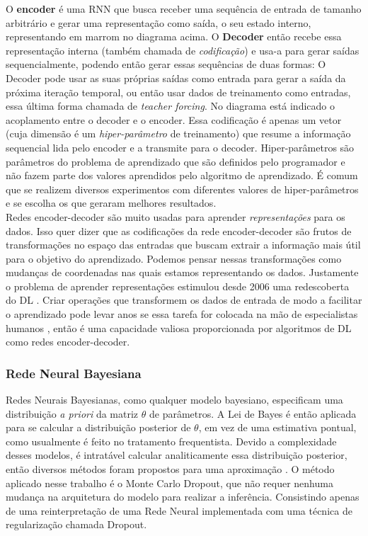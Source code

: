 O \textbf{encoder} é uma RNN que busca receber uma sequência de entrada de
tamanho arbitrário e gerar uma representação como saída, o seu estado interno,
representando em marrom no diagrama acima. O \textbf{Decoder} então recebe essa representação interna (também chamada
de \textit{codificação}) e usa-a para gerar saídas sequencialmente, podendo
então gerar essas sequências de duas formas: O Decoder pode usar as suas próprias saídas
como entrada para gerar a saída da próxima iteração temporal, ou então usar dados de treinamento como
entradas, essa última forma chamada de \textit{teacher forcing}. No diagrama
está indicado o acoplamento entre o decoder e o encoder. Essa codificação é apenas
um vetor (cuja dimensão é um \textit{hiper-parâmetro} de treinamento) que resume a
informação sequencial lida pelo encoder e a transmite para o decoder.
Hiper-parâmetros são parâmetros do problema de aprendizado que são definidos
pelo programador e não fazem parte dos valores aprendidos pelo algoritmo de
aprendizado. É comum que se realizem diversos experimentos com diferentes
valores de hiper-parâmetros e se escolha os que geraram melhores resultados. 
\\

Redes encoder-decoder são muito usadas para aprender \textit{representações} para os
dados. Isso quer dizer que as codificações da rede encoder-decoder são frutos de
transformações no espaço das entradas que buscam extrair a informação mais útil
para o objetivo do aprendizado. Podemos pensar nessas transformações como
mudanças de coordenadas nas quais estamos representando os dados. Justamente o problema de aprender
representações estimulou desde 2006 uma redescoberta do DL \citep{dlbook}. Criar
operações que transformem os dados de entrada de modo a facilitar o aprendizado
pode levar anos se essa tarefa for colocada na mão de especialistas humanos
\citep{dlbook}, então é uma capacidade valiosa proporcionada por algoritmos de
DL como redes encoder-decoder. \\





\subsubsection{Rede Neural Bayesiana}

Redes Neurais Bayesianas, como qualquer modelo bayesiano, especificam uma distribuição \textit{a priori} da matriz $\theta$ de parâmetros.
A Lei de Bayes é então aplicada para se calcular a distribuição posterior de
$\theta$, em vez de uma estimativa pontual, como usualmente é feito no tratamento frequentista.
Devido a complexidade desses modelos, é intratável calcular analiticamente essa distribuição posterior, então diversos métodos foram propostos para uma aproximação \citep{Gal2016Uncertainty}.
O método aplicado nesse trabalho é o Monte Carlo Dropout, que não requer nenhuma mudança na arquitetura do modelo para realizar a inferência. Consistindo apenas de uma reinterpretação de uma Rede Neural implementada com uma técnica de regularização chamada Dropout. 

